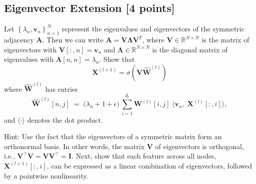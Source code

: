 \subsection{Eigenvector Extension [4 points]}\label{probelm:eig}
Let $\left\{\lambda_n,\mathbf{v}_n\right\}_{n=1}^N$ represent the eigenvalues and eigenvectors of the symmetric adjacency $\mathbf{A}$. Then we can write $\mathbf{A}=\mathbf{V}\mathbf{\Lambda}\mathbf{V}^T$, where $\mathbf{V}\in\mathbb{R}^{N\times N}$ is the matrix of eigenvectors with $\mathbf{V}[:,n]=\mathbf{v}_n$ and $\mathbf{\Lambda}\in\mathbb{R}^{N\times N}$ is the diagonal matrix of eigenvalues with $\mathbf{\Lambda}[n,n]=\lambda_n$. Show that 
\begin{equation*}
\mathbf{X}^{(l+1)} =\sigma\left(\mathbf{V} \hat{\mathbf{W}}^{(l)}\right)
\end{equation*}
where $\hat{\mathbf{W}}^{(l)}$ has entries
\[
\hat{\mathbf{W}}^{(l)}[n,j]
\;=\;
\big(\lambda_n+1+\epsilon\big)\,
\sum_{i=1}^{d_l}\mathbf{W}^{(l)}[i,j]\;\big\langle \mathbf{v}_n,\;\mathbf{X}^{(l)}[:,i]\big\rangle,
\]
and $\langle\cdot\rangle$ denotes the dot product. 

Hint: Use the fact that the eigenvectors of a symmetric matrix form an orthonormal basis. In other words, the matrix $\mathbf{V}$ of eigenvectors is orthogonal, i.e., $\mathbf{V}^\top\mathbf{V}=\mathbf{V}\mathbf{V}^\top = \mathbf{I}$. 
Next, show that each feature across all nodes, $\mathbf{X}^{(l+1)}[:,i]$, can be expressed as a linear combination of eigenvectors, followed by a pointwise nonlinearity. 





